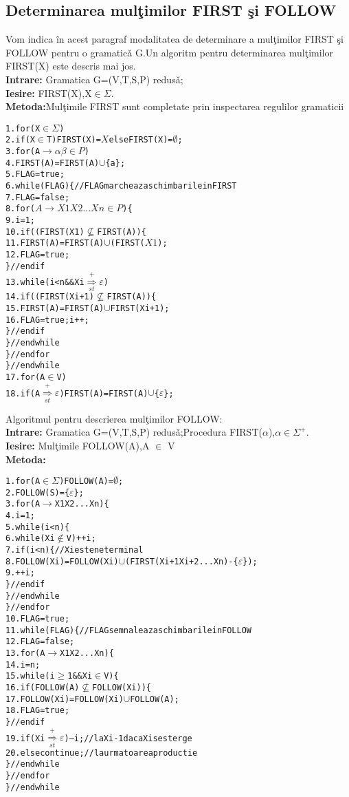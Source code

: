 \subsection{Determinarea mul\c timilor FIRST \c si FOLLOW }
Vom indica \^ in acest paragraf modalitatea de determinare a mul\c timilor FIRST \c si FOLLOW pentru o gramatic\v a G.Un algoritm pentru determinarea mul\c timilor FIRST(X) este descris mai jos.\\
\textbf{Intrare:} Gramatica G=(V,T,S,P) redus\v a;\\
\textbf{Iesire:} FIRST(X),X$\in \Sigma$.\\
\textbf{Metoda:}Mul\c timile FIRST sunt completate prin inspectarea regulilor gramaticii\\
\begin{alltt}
1.for (X \(\in \Sigma\))
2.	if (X\( \in\)T) FIRST(X) = \({ X }\) else FIRST(X)=\(\emptyset\);
3.for (A \(\rightarrow \alpha \beta \in P\))
4.	FIRST (A) = FIRST(A) \(\cup\) \{ a \};
5.FLAG = true;
6.while(FLAG) \{ // FLAG marcheaza schimbarile in FIRST
7.	FLAG = false;
8.	for( \(A \rightarrow X1 X2 \ldots Xn \in P \)) \{
9.		i = 1;
10.     if((FIRST(X1)\(\nsubseteq\)FIRST(A)) \{
11.     	FIRST(A) = FIRST(A)\(\cup\)(FIRST(\(X1\));
12.			FLAG = true;
		\}//endif
13.		while(i<n && Xi\(\overset{+}{\underset{st}{\Rightarrow}}\)\(\varepsilon \) )
14.			if((FIRST(Xi+1)\( \nsubseteq \)FIRST(A)) \{
15.				FIRST(A) = FIRST(A)\(\cup\)FIRST(Xi+1);
16.				FLAG = true; i++;
			\}//endif
		\}//endwhile
	\}//endfor
\}//endwhile
17.for (A\(\in \)V)
18.if(A\( \overset{+}{\underset{st}{\Rightarrow}}\)\(\varepsilon \)) FIRST(A) = FIRST(A)\(\cup\)\{ \(\varepsilon \)\} ; 

\end{alltt}

Algoritmul pentru descrierea mul\c timilor FOLLOW:\\
\textbf{Intrare:} Gramatica G=(V,T,S,P) redus\v a;Procedura FIRST($\alpha$),$\alpha \in \Sigma^{+}$. \\
\textbf{Iesire:} Mul\c timile FOLLOW(A),A $\in$ V\\
\textbf{Metoda:} \\

\begin{alltt}
1.for (A\(\in \Sigma\)) FOLLOW(A) =\(\emptyset \);
2.FOLLOW(S)= \{\(\varepsilon \)\} ;
3.for (A\(\rightarrow \)X1X2...Xn) \{
4.	i = 1;
5.	while (i<n) \{
6.		while (Xi\(\notin \)V) ++i;
7.		if (i<n) \{// Xi este neterminal
8.			FOLLOW(Xi) = FOLLOW(Xi)\(\cup\)(FIRST(Xi+1Xi+2...Xn)-\{\(\varepsilon\)\});
9.			++i;
		\}//endif
	\}//endwhile
\}//endfor
10.FLAG = true;
11.while (FLAG) \{ // FLAG semnaleaza schimbarile in FOLLOW
12.	FLAG = false;
13.	for (A\( \rightarrow\)X1X2...Xn) \{
14.		i = n;
15.		while (i\(\geq\)1 && Xi \(\in\)V)\{
16.			if (FOLLOW (A)\(\nsubseteq \)FOLLOW(Xi) )\{
17.FOLLOW(Xi) = FOLLOW(Xi)\(\cup \)FOLLOW (A);
18.FLAG = true;
\}//endif
19.if(Xi\(\overset{+}{\underset{st}{\Rightarrow}}\)\(\varepsilon\))--i;// la Xi-1 daca Xi se sterge
20. else continue; // la urmatoarea productie
		\}//endwhile
	\}//endfor
\}//endwhile 
\end{alltt}

